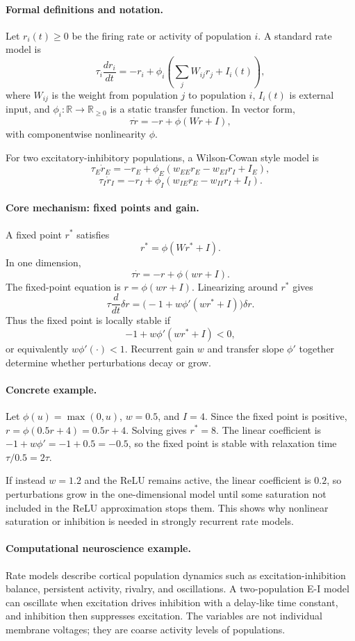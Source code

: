 \paragraph{Formal definitions and notation.}
Let \(r_i(t)\geq0\) be the firing rate or activity of population \(i\). A standard rate model is
\[
\tau_i\frac{dr_i}{dt}=-r_i+\phi_i\!\left(\sum_j W_{ij}r_j+I_i(t)\right),
\]
where \(W_{ij}\) is the weight from population \(j\) to population \(i\), \(I_i(t)\) is external input, and \(\phi_i:\mathbb{R}\to\mathbb{R}_{\geq0}\) is a static transfer function. In vector form,
\[
\tau\dot r=-r+\phi(Wr+I),
\]
with componentwise nonlinearity \(\phi\).

For two excitatory-inhibitory populations, a Wilson-Cowan style model is
\[
\tau_E\dot r_E=-r_E+\phi_E(w_{EE}r_E-w_{EI}r_I+I_E),
\]
\[
\tau_I\dot r_I=-r_I+\phi_I(w_{IE}r_E-w_{II}r_I+I_I).
\]

\paragraph{Core mechanism: fixed points and gain.}
A fixed point \(r^*\) satisfies
\[
r^*=\phi(Wr^*+I).
\]
In one dimension,
\[
\tau\dot r=-r+\phi(wr+I).
\]
The fixed-point equation is \(r=\phi(wr+I)\). Linearizing around \(r^*\) gives
\[
\tau\frac{d}{dt}\delta r=\bigl(-1+w\phi'(wr^*+I)\bigr)\delta r.
\]
Thus the fixed point is locally stable if
\[
-1+w\phi'(wr^*+I)<0,
\]
or equivalently \(w\phi'(\cdot)<1\). Recurrent gain \(w\) and transfer slope \(\phi'\) together determine whether perturbations decay or grow.

\paragraph{Concrete example.}
Let \(\phi(u)=\max(0,u)\), \(w=0.5\), and \(I=4\). Since the fixed point is positive, \(r=\phi(0.5r+4)=0.5r+4\). Solving gives \(r^*=8\). The linear coefficient is \(-1+w\phi'= -1+0.5=-0.5\), so the fixed point is stable with relaxation time \(\tau/0.5=2\tau\).

If instead \(w=1.2\) and the ReLU remains active, the linear coefficient is \(0.2\), so perturbations grow in the one-dimensional model until some saturation not included in the ReLU approximation stops them. This shows why nonlinear saturation or inhibition is needed in strongly recurrent rate models.

\paragraph{Computational neuroscience example.}
Rate models describe cortical population dynamics such as excitation-inhibition balance, persistent activity, rivalry, and oscillations. A two-population E-I model can oscillate when excitation drives inhibition with a delay-like time constant, and inhibition then suppresses excitation. The variables are not individual membrane voltages; they are coarse activity levels of populations.

